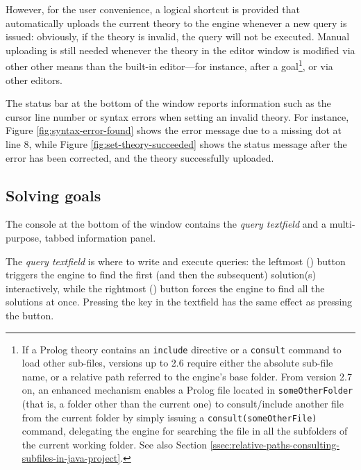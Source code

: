 However, for the user convenience, a logical shortcut is provided that automatically uploads the current theory to the engine whenever a new query is issued: obviously, if the theory is invalid, the query will not be executed.
%
Manual uploading is still needed whenever the theory in the editor window is modified via other other means than the built-in editor---for instance, after a  goal\footnote{%
  If a Prolog theory contains an \texttt{include} directive or a \texttt{consult} command to load other sub-files,
  \tuprolog{} versions up to 2.6 require either the absolute sub-file name, or a relative path referred to the engine's
  base folder. From version 2.7 on, an enhanced mechanism enables a Prolog file located in \texttt{someOtherFolder} (that is, a folder other than the current one) to consult/include another file from the current
  folder by simply issuing a \texttt{consult(someOtherFile)} command, delegating the \tuprolog{} engine for searching the file in all the subfolders of the current working folder. See also Section \ref{ssec:relative-paths-consulting-subfiles-in-java-project}.
}, or via other editors.

The status bar at the bottom of the window reports information such as the cursor line number or syntax errors when setting an invalid theory.
%
For instance, Figure \ref{fig:syntax-error-found} shows the error message due to a missing dot at line 8, while Figure \ref{fig:set-theory-succeeded} shows the status message after the error has been corrected, and the theory successfully uploaded.

\subsection{Solving goals}
\label{sec:solving-goals}

The console at the bottom of the window contains the \textit{query textfield} and a multi-purpose, tabbed information panel.

The \textit{query textfield} is where to write and execute queries: the leftmost () button triggers the engine to find the first (and then the subsequent) solution(s) interactively, while the rightmost () button forces the engine to find all the solutions at once.
%
Pressing the  key in the textfield has the same effect as pressing the  button.

